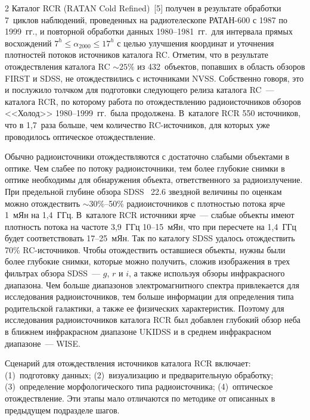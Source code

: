 \begin{multicols}{2}
      Каталог RCR (RATAN Cold Refined)~[5] получен в результате обработки 
7~циклов наблюдений, проведенных на радиотелескопе РАТАН-600 с 1987 по 1999~гг., и 
повторной обработки данных 1980--1981~гг.\ для интервала прямых восхождений $7^h \leq 
\alpha_{2000}\leq 17^h$ с целью улучшения координат и уточнения плотностей потоков 
источников каталога RC. Отметим, что в результате отождествления каталога RC 
$\sim25\%$ из 432~объектов, попавших в область обзоров FIRST и SDSS, не 
отождествились с источниками NVSS. Собственно говоря, это и послужило толчком для 
подготовки следующего релиза каталога RC~--- каталога RCR, по которому работа по 
отождествлению радиоисточников обзоров <<Холод>> 1980--1999~гг.\ была продолжена. 
В~каталоге RCR 550 источников, что в 1,7~раза больше, чем количество RC-ис\-точ\-ни\-ков, 
для которых уже проводилось оптическое отождествление.
      
      Обычно радиоисточники отождествляются с доста\-точ\-но слабыми объектами в оптике. 
Чем слабее по потоку радиоисточники, тем более глубокие снимки в оптике необходимы для 
обнаружения объекта, ответственного за радиоизлучение. При предельной глубине обзора 
SDSS ~22.6 звездной величины по оценкам можно отождествить $\sim30\%$--50\% 
радиоисточников с плотностью потока ярче 1~мЯн на 1,4~ГГц. В~каталоге RCR источники 
ярче~--- слабые объекты имеют плотность потока на частоте 3,9~ГГц 10--15~мЯн, что при 
пересчете на 1,4~ГГц будет соответствовать 17--25~мЯн. Так по каталогу SDSS удалось 
отождествить 70\% RC-ис\-точ\-ни\-ков. Чтобы отождествить оставшиеся объекты, нужны 
были более глубокие снимки, которые можно получить, сложив изображения в трех 
фильтрах обзора SDSS~--- $g$, $r$ и $i$, а также используя обзоры инфракрасного 
диапазона. Чем больше диапазонов электромагнитного спектра привлекается для 
исследования радиоисточников, тем больше информации для определения типа 
родительской галактики, а также ее физических характеристик. Поэтому для исследования 
радиоисточников каталога RCR был добавлен глубокий обзор неба в ближнем 
инфракрасном диапазоне UKIDSS и в среднем инфракрасном диапазоне~--- WISE. 
      
      Сценарий для отождествления источников каталога RCR включает: (1)~подготовку 
данных; (2)~визуализацию и предварительную обработку; (3)~определение морфологического 
типа радиоисточника; (4)~оптическое отождествление. Эти этапы мало отличаются по 
методике от описанных в предыдущем подразделе шагов. 

      \begin{table}[b]\small
      \begin{center}
      \vspace*{2ex}
      

\end{center}
\end{table}
\end{multicols}
